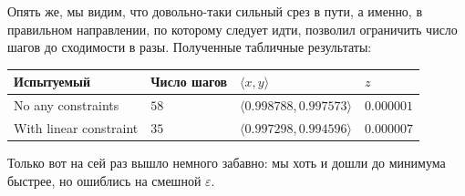 \documentclass[12pt, a4paper, oneside, final]{article}
\begin{document}
	Опять же, мы видим, что довольно-таки сильный срез в пути, а именно, в правильном направлении, по которому следует идти, позволил ограничить число шагов до сходимости в разы.
	Полученные табличные результаты:
	\begin{table}[H]
		\centering
		\begin{tabular}{l|l|l|l}
			Испытуемый & Число шагов & $\langle x, y \rangle$ & $z$ \\ \hline
			No any constraints & $58$ & $\langle 0.998788, 0.997573 \rangle$ & $0.000001$ \\
			With linear constraint & $35$ & $\langle 0.997298, 0.994596 \rangle$ & $0.000007$
		\end{tabular}
	\end{table}
	Только вот на сей раз вышло немного забавно: мы хоть и дошли до минимума быстрее, но ошиблись на смешной $\varepsilon$.
\end{document}
